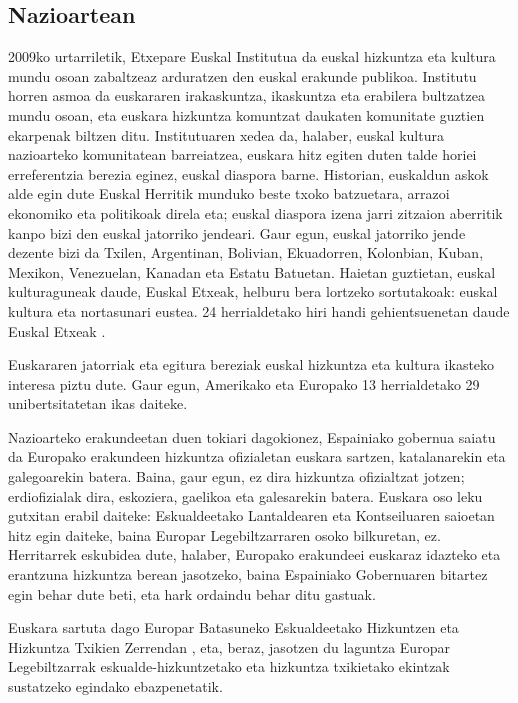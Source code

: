 \begin{multicols}{2}
\subsection{Nazioartean}

    2009ko urtarriletik, Etxepare Euskal Institutua da euskal hizkuntza eta kultura mundu osoan zabaltzeaz arduratzen den euskal erakunde publikoa. Institutu horren asmoa da euskararen irakaskuntza, ikaskuntza eta erabilera bultzatzea mundu osoan, eta euskara hizkuntza komuntzat daukaten komunitate guztien ekarpenak biltzen ditu. Institutuaren xedea da, halaber, euskal kultura nazioarteko komunitatean barreiatzea, euskara hitz egiten duten talde horiei erreferentzia berezia eginez, euskal diaspora barne. Historian, euskaldun askok alde egin dute Euskal Herritik munduko beste txoko batzuetara, arrazoi ekonomiko eta politikoak direla eta; euskal diaspora izena jarri zitzaion aberritik kanpo bizi den euskal jatorriko jendeari. Gaur egun, euskal jatorriko jende dezente bizi da Txilen, Argentinan, Bolivian, Ekuadorren, Kolonbian, Kuban, Mexikon, Venezuelan, Kanadan eta Estatu Batuetan. Haietan guztietan, euskal kulturaguneak daude, Euskal Etxeak, helburu bera lortzeko sortutakoak: euskal kultura eta nortasunari eustea. 24 herrialdetako hiri handi gehientsuenetan daude Euskal Etxeak \cite{BAS-Nota14}. 

Euskararen jatorriak eta egitura bereziak euskal hizkuntza eta kultura ikasteko interesa piztu dute. Gaur egun, Amerikako eta Europako 13 herrialdetako 29 unibertsitatetan ikas daiteke.

Nazioarteko erakundeetan duen tokiari dagokionez, Espainiako gobernua saiatu da Europako erakundeen hizkuntza ofizialetan euskara sartzen, katalanarekin eta galegoarekin batera. Baina, gaur egun, ez dira hizkuntza ofizialtzat jotzen; erdiofizialak dira, eskoziera, gaelikoa eta galesarekin batera. Euskara oso leku gutxitan erabil daiteke: Eskualdeetako Lantaldearen eta Kontseiluaren saioetan hitz egin daiteke, baina Europar Legebiltzarraren osoko bilkuretan, ez. Herritarrek eskubidea dute, halaber, Europako erakundeei euskaraz idazteko eta erantzuna hizkuntza berean jasotzeko, baina Espainiako Gobernuaren bitartez egin behar dute beti, eta hark ordaindu behar ditu gastuak.

Euskara sartuta dago Europar Batasuneko Eskualdeetako Hizkuntzen eta Hizkuntza Txikien Zerrendan \cite{BAS-Nota15}, eta, beraz, jasotzen du laguntza Europar Legebiltzarrak eskualde-hizkuntzetako eta hizkuntza txikietako ekintzak sustatzeko egindako ebazpenetatik. 


\end{multicols}
